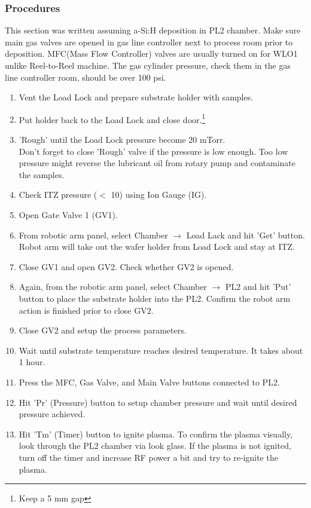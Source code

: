 \subsubsection{Procedures}
This section was written assuming a-Si:H deposition in PL2 chamber. Make sure main gas valves are opened in gas line controller next to process room prior to deposition. MFC(Mass Flow Controller) valves are usually turned on for WLO1 unlike Reel-to-Reel machine. The gas cylinder pressure, check them in the gas line controller room, should be over 100 psi.
\begin{enumerate}
  \item Vent the Load Lock and prepare substrate holder with samples.
  \item Put holder back to the Load Lock and close door.\footnote{Keep a 5 mm gap}
  \item 'Rough' until the Load Lock pressure become 20 mTorr. \\
    Don't forget to close 'Rough' valve if the pressure is low enough. Too low pressure might reverse the lubricant oil from rotary pump and contaminate the samples.
  \item Check ITZ pressure ($<$ 10) using Ion Gauge (IG).
  \item Open Gate Valve 1 (GV1).
  \item From robotic arm panel, select Chamber $\rightarrow$ Load Lack and hit 'Get' button. Robot arm will take out the wafer holder from Load Lock and stay at ITZ.
  \item Close GV1 and open GV2. Check whether GV2 is opened.
  \item Again, from the robotic arm panel, select Chamber $\rightarrow$ PL2 and hit 'Put' button to place the substrate holder into the PL2. Confirm the robot arm action is finished prior to close GV2.
  \item Close GV2 and setup the process parameters. 
  \item Wait until substrate temperature reaches desired temperature. It takes about 1 hour.
  \item Press the MFC, Gas Valve, and Main Valve buttons connected to PL2.
  \item Hit 'Pr' (Pressure) button to setup chamber pressure and wait until desired pressure achieved.
  \item Hit 'Tm' (Timer) button to ignite plasma. To confirm the plasma visually, look through the PL2 chamber via look glass. If the plasma is not ignited, turn off the timer and increase RF power a bit and try to re-ignite the plasma. 

\end{enumerate}
